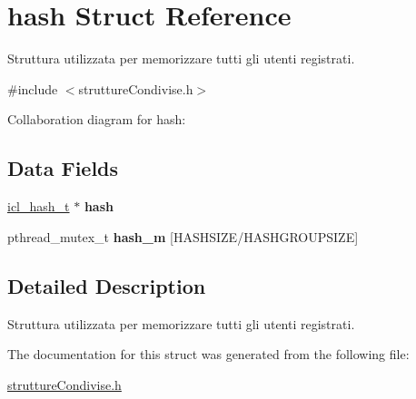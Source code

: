 \hypertarget{structhash}{}\section{hash Struct Reference}
\label{structhash}


Struttura utilizzata per memorizzare tutti gli utenti registrati.  




{\ttfamily \#include $<$strutture\+Condivise.\+h$>$}



Collaboration diagram for hash\+:
\subsection*{Data Fields}
\begin{DoxyCompactItemize}
\item 
\mbox{\label{structhash_a4113d849f59504f8c99e0fedc9545042}} 
\hyperlink{structicl__hash__s}{icl\+\_\+hash\+\_\+t} $\ast$ {\bfseries hash}
\item 
\mbox{\label{structhash_a202bb42b1e4b1e62349d5b2c62da08ad}} 
pthread\+\_\+mutex\+\_\+t {\bfseries hash\+\_\+m} \mbox{[}H\+A\+S\+H\+S\+I\+ZE/H\+A\+S\+H\+G\+R\+O\+U\+P\+S\+I\+ZE\mbox{]}
\end{DoxyCompactItemize}


\subsection{Detailed Description}
Struttura utilizzata per memorizzare tutti gli utenti registrati. 

The documentation for this struct was generated from the following file\+:\begin{DoxyCompactItemize}
\item 
\hyperlink{strutture_condivise_8h}{strutture\+Condivise.\+h}\end{DoxyCompactItemize}
